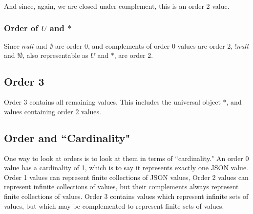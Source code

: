 \documentclass[letterpaper]{article}
\begin{document}
And since, again, we are closed under complement, this is an order 2 value.

\subsubsection{Order of \(U\) and \(*\)}

Since \(null\) and \(\emptyset\) are order 0, and complements of order 0 values
are order 2, \(!null\) and \(!\emptyset\), also representable as \(U\) and
\(*\), are order 2.

\subsection{Order 3}
Order 3 contains all remaining values. This includes the universal object \({ *
}\), and values containing order 2 values.

\subsection{Order and ``Cardinality"}

One way to look at orders is to look at them in terms of ``cardinality." An
order 0 value has a cardinality of 1, which is to say it represents exactly one
JSON value.  Order 1 values can represent finite collections of JSON values,
Order 2 values can represent infinite collections of values, but their
complements always represent finite collections of values. Order 3 contains
values which represent infinite sets of values, but which may be complemented
to represent finite sets of values.
\end{document}
